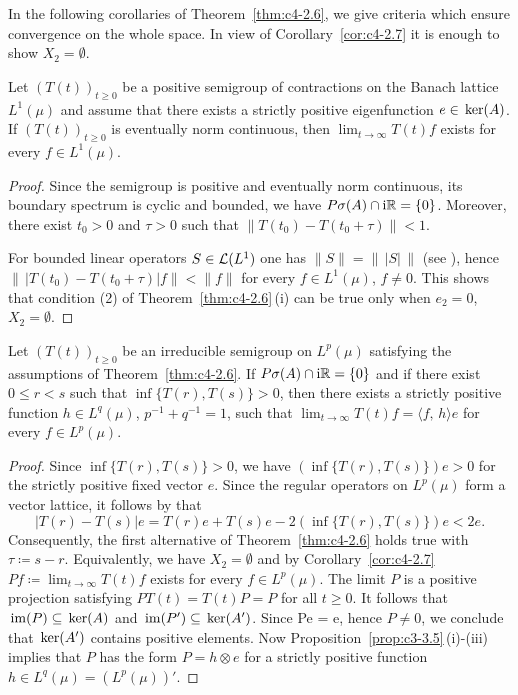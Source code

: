 In the following corollaries of Theorem~\ref{thm:c4-2.6}, we give criteria which ensure convergence on the whole space.
In view of Corollary~\ref{cor:c4-2.7} it is enough to show $X_{2} = \emptyset$.
\begin{corollary}\label{cor:c4-2.9}
%
Let $(T(t))_{t \geq 0}$ be a positive semigroup of contractions on the Banach lattice $L^{1}(\mu)$ and assume that there exists a strictly positive eigenfunction $e \in \mathop{}\mathrm{ker}(A)$.
If\/ $(T(t))_{t \geq 0}$ is eventually norm continuous, then $\lim_{t \to \infty}T(t)f$ exists for every $f \in L^{1}(\mu)$.
\end{corollary}
\begin{proof}
Since the semigroup is positive and eventually norm continuous, its boundary spectrum is cyclic and bounded, \ie  we have $P{\sigma}(A) \cap \mathrm{i}\mathbb{R} = \{0\}$.
Moreover, there exist $t_{0} > 0$ and $\tau > 0$ such that $\|T(t_{0}) - T(t_{0}+\tau)\| < 1$.

For bounded linear operators $S \in \mathcal{L}(L^{1})$ 
one has $\|S\| = \|\,|S|\,\|$ (see \textcite[IV, Theorem 1.5]{schaefer:1974}), hence $\|\,|T(t_{0}) - T(t_{0}+\tau)| f\| < \|f\|$ for every $f \in L^{1}(\mu)$, $f \neq 0$.
This shows that condition (2) of Theorem~\ref{thm:c4-2.6}\,(i) can be true only when $e_{2} = 0$, \ie  $X_{2} = \emptyset$.
\end{proof}
\begin{corollary}\label{cor:c4-2.10}
%
%
Let $(T(t))_{t\geq 0}$ be an irreducible semigroup on $L^{p}(\mu)$ satisfying the assumptions of Theorem~\ref{thm:c4-2.6}.
If\/ $P{\sigma}(A) \cap \mathrm{i}\mathbb{R} = \{0\}$ and if there exist $0 \leq r < s$ such that $\inf\{T(r),T(s)\} > 0$, then there exists a strictly positive function $h \in L^{q}(\mu)$, $p^{-1}+q^{-1} = 1$, such that $\lim_{t \to \infty} T(t)f = \langle f,\,h \rangle e$ for every $f \in L^{p}(\mu)$.
\end{corollary}
\begin{proof}
Since $\inf\{T(r),T(s)\} > 0$, we have $(\inf\{T(r),T(s)\})e > 0$ for the strictly positive fixed vector $e$.
Since the regular operators on $L^{p}(\mu)$ form a vector lattice, it follows by \textcite[II.1.4, Formula (5) \& (5')]{schaefer:1974} that 
\[
|T(r) - T(s)|e = T(r)e + T(s)e - 2(\inf\{T(r),T(s)\})e < 2e .
\]
Consequently, the first alternative of Theorem~\ref{thm:c4-2.6} holds true with $\tau \coloneq s-r$.
Equivalently, we have $X_{2} = \emptyset$ and by Corollary~\ref{cor:c4-2.7} $Pf \coloneq \lim_{t \to \infty} T(t)f$ exists for every $f \in L^{p}(\mu)$.
The limit $P$ is a positive projection satisfying $PT(t) = T(t)P = P$ for all $t \geq 0$.
It follows that $\mathop{}\mathrm{im}(P) \subseteq \mathop{}\mathrm{ker}(A)$ and $\mathop{}\mathrm{im}(P') \subseteq \mathop{}\mathrm{ker}(A')$.
Since Pe = e, hence $P \neq 0$, we conclude that $\mathop{}\mathrm{ker}(A')$ contains positive elements.
Now Proposition~\ref{prop:c3-3.5}\,(i)-(iii) implies that $P$ has the form $P = h \otimes e$ for a strictly positive function $h \in L^{q}(\mu) = (L^{p}(\mu))'$.
\end{proof}

